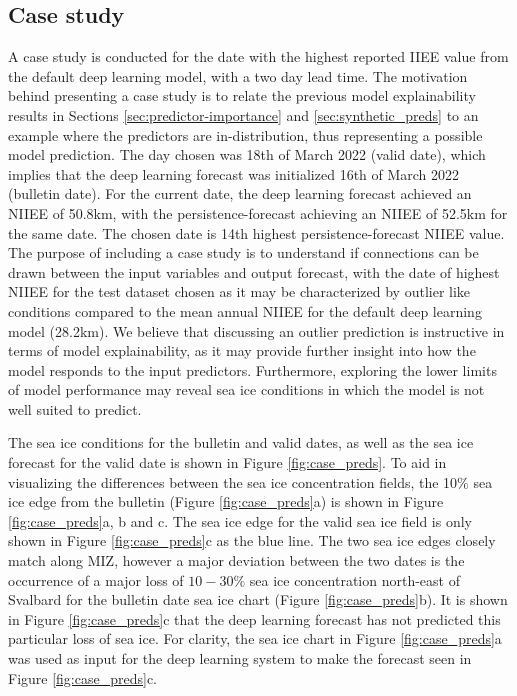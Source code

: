 \documentclass[../main/thesis.tex]{subfiles}
\begin{document}
\subsection{Case study}
A case study is conducted for the date with the highest reported IIEE value from the default deep learning model, with a two day lead time. The motivation behind presenting a case study is to relate the previous model explainability results in Sections \ref{sec:predictor-importance} and \ref{sec:synthetic_preds} to an example where the predictors are in-distribution, thus representing a possible model prediction. The day chosen was 18th of March 2022 (valid date), which implies that the deep learning forecast was initialized 16th of March 2022 (bulletin date). For the current date, the deep learning forecast achieved an NIIEE of 50.8km, with the persistence-forecast achieving an NIIEE of 52.5km for the same date. The chosen date is 14th highest persistence-forecast NIIEE value. The purpose of including a case study is to understand if connections can be drawn between the input variables and output forecast, with the date of highest NIIEE for the test dataset chosen as it may be characterized by outlier like conditions compared to the mean annual NIIEE for the default deep learning model (28.2km). We believe that discussing an outlier prediction is instructive in terms of model explainability, as it may provide further insight into how the model responds to the input predictors. Furthermore, exploring the lower limits of model performance may reveal sea ice conditions in which the model is not well suited to predict.

The sea ice conditions for the bulletin and valid dates, as well as the sea ice forecast for the valid date is shown in Figure \ref{fig:case_preds}. To aid in visualizing the differences between the sea ice concentration fields, the 10\% sea ice edge from the bulletin (Figure \ref{fig:case_preds}a) is shown in Figure \ref{fig:case_preds}a, b and c. The sea ice edge for the valid sea ice field is only shown in Figure \ref{fig:case_preds}c as the blue line. The two sea ice edges closely match along MIZ, however a major deviation between the two dates is the occurrence of a major loss of $10-30\%$ sea ice concentration north-east of Svalbard for the bulletin date sea ice chart (Figure \ref{fig:case_preds}b). It is shown in Figure \ref{fig:case_preds}c that the deep learning forecast has not predicted this particular loss of sea ice. For clarity, the sea ice chart in Figure \ref{fig:case_preds}a was used as input for the deep learning system to make the forecast seen in Figure \ref{fig:case_preds}c.
\end{document}
